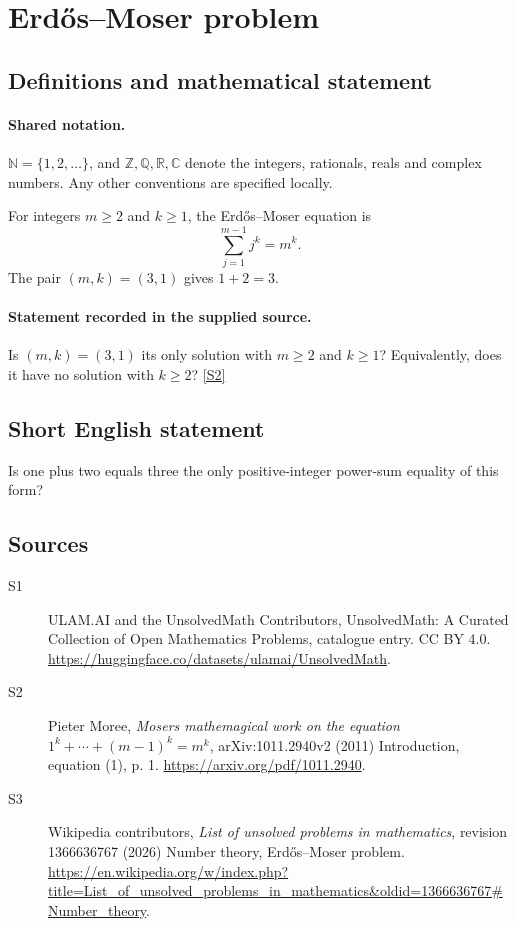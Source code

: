 \documentclass[11pt]{article}
\newcommand{\sref}[2]{\hyperlink{source:#1:#2}{[S#2]}}
\begin{document}
\section{Erdős–Moser problem}\label{statement}

\subsection{Definitions and mathematical statement}

\paragraph{Shared notation.}$\mathbb N=\{1,2,\ldots\}$, and $\mathbb Z,\mathbb Q,\mathbb R,\mathbb C$ denote the integers, rationals, reals and complex numbers. Any other conventions are specified locally.


For integers $m\ge2$ and $k\ge1$, the Erd\H{o}s--Moser equation is
\[
\sum_{j=1}^{m-1}j^k=m^k.
\]
The pair $(m,k)=(3,1)$ gives $1+2=3$.
\paragraph{Statement recorded in the supplied source.}
Is $(m,k)=(3,1)$ its only solution with $m\ge2$ and $k\ge1$? Equivalently, does it have no solution with $k\ge2$? \sref{statement}{2}
\subsection{Short English statement}
Is one plus two equals three the only positive-integer power-sum equality of this form?
\subsection{Sources}
\begin{description}
\item[\hypertarget{source:statement:1}{S1}] ULAM.AI and the UnsolvedMath Contributors, UnsolvedMath: A Curated Collection of Open Mathematics Problems, catalogue entry. CC BY 4.0. \url{https://huggingface.co/datasets/ulamai/UnsolvedMath}.
\item[\hypertarget{source:statement:2}{S2}] Pieter Moree, \emph{Moser\textquotesingle s mathemagical work on the equation $1^k+\cdots+(m-1)^k=m^k$}, arXiv:1011.2940v2 (2011) Introduction, equation (1), p. 1. \url{https://arxiv.org/pdf/1011.2940}.
\item[\hypertarget{source:statement:3}{S3}] Wikipedia contributors, \emph{List of unsolved problems in mathematics}, revision 1366636767 (2026) Number theory, Erdős–Moser problem. \url{https://en.wikipedia.org/w/index.php?title=List_of_unsolved_problems_in_mathematics&oldid=1366636767#Number_theory}.
\end{description}
\label{end:statement}
\end{document}
